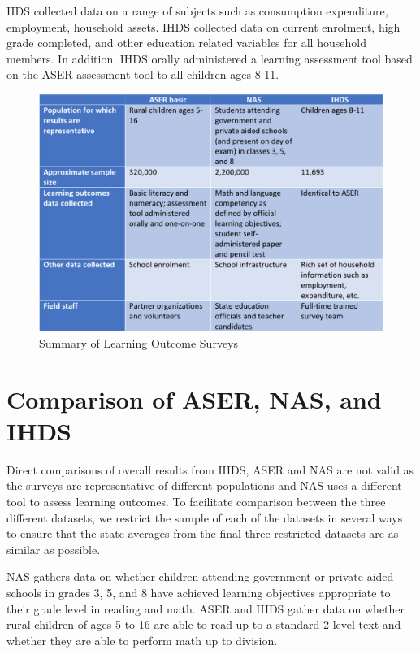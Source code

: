 \documentclass[
  11pt,
]{article}
\begin{document}
HDS collected data on a range of subjects such as consumption expenditure, employment, household assets. IHDS collected data on current enrolment, high grade completed, and other education related variables for all household members. In addition, IHDS orally administered a learning assessment tool based on the ASER assessment tool to all children ages 8-11.

\begin{figure}

{\centering \includegraphics[width=0.8\linewidth]{summary_learning_outcomes} 

}

\caption{Summary of Learning Outcome Surveys}\label{fig:learningoutcomes}
\end{figure}

\hypertarget{comparison}{%
\section{Comparison of ASER, NAS, and IHDS}\label{comparison}}

Direct comparisons of overall results from IHDS, ASER and NAS are not valid as the surveys are representative of different populations and NAS uses a different tool to assess learning outcomes. To facilitate comparison between the three different datasets, we restrict the sample of each of the datasets in several ways to ensure that the state averages from the final three restricted datasets are as similar as possible.

NAS gathers data on whether children attending government or private aided schools in grades 3, 5, and 8 have achieved learning objectives appropriate to their grade level in reading and math. ASER and IHDS gather data on whether rural children of ages 5 to 16 are able to read up to a standard 2 level text and whether they are able to perform math up to division.
\end{document}
